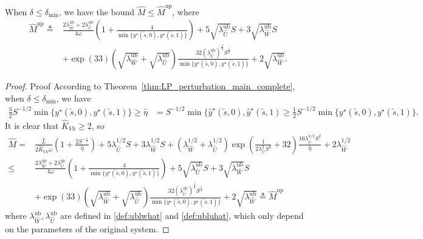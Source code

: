 \documentclass[mnsc,nonblindrev]{informs3}
\newcommand{\luhat}{\lambda_{\widehat{U}}}
\newcommand{\lwhhalf}{\lambda_{\widehat{W}}^{1/2}}
\newcommand{\luhhalf}{\lambda_{\widehat{U}}^{1/2}}
\newcommand{\ublwhat}{\lambda^{\mathrm{ub}}_{\widehat{W}}}
\newcommand{\ubluhat}{\lambda^{\mathrm{ub}}_{\widehat{U}}}
\newcommand{\ubmhat}{\widehat{M}^{\mathrm{up}}}
\newcommand{\yhat}{\widehat{y}}
\begin{document}
\begin{APPENDICES}
\begin{lemma}\label{lem:bound-of-Mhat}
    When $\delta\le\delta_{\min}$, we have the bound $\widehat{M}\le\ubmhat$, where
    \begin{equation}\label{def:ubmhat}
    \begin{aligned}
        \ubmhat\triangleq&\frac{2\ublwhat+2\ubluhat}{4\omega}\left(1+\frac{4}{\min\{y^\star(\tilde{s},0),y^\star(\tilde{s},1)\}}\right)+5\sqrt{\ubluhat}S+3\sqrt{\ublwhat}S\\
         & +\exp(33)\left(\sqrt{\ublwhat}+\sqrt{\ubluhat}\right)\frac{32(\ubluhat)^{\frac{3}{2}}S^{\frac{5}{2}}}{\min\{y^\star(\tilde{s},0),y^\star(\tilde{s},1)\}}+2\sqrt{\ublwhat}.
    \end{aligned}
    \end{equation}
\end{lemma}

\begin{proof}{Proof}
According to Theorem~\ref{thm:LP_perturbation_main_complete}, when $\delta\le\delta_{\min}$, we have
\begin{align*}
    \frac{3}{2}S^{-1/2}\min\{y^\star(\tilde{s},0),y^\star(\tilde{s},1)\}
    \ge\widehat \eta
    &=S^{-1/2}\min\{\yhat^\star(\tilde{s},0),\yhat^\star(\tilde{s},1) 
    \ge \frac{1}{2}S^{-1/2}\min\{y^\star(\tilde{s},0),y^\star(\tilde{s},1)\}.
    \end{align*}
It is clear that $\widehat K_{Vh}\ge 2$, so
    \begin{align*}
        \widehat M=&\frac{\widehat L}{2\widehat K_{Vh}\omega}\left(1
  + \frac{2S^{-\frac{1}{2}}}
         {\widehat \eta}\right)+5\luhhalf S+3\lwhhalf S 
          +(\lwhhalf+\luhhalf)\exp\left(\frac{1}{2\luhat^3S^3}+32\right)\frac{16\luhat^{3/2}S^{2}}{\widehat \eta} +2\lwhhalf \\
         \le &\frac{2\ublwhat+2\ubluhat}{4\omega}\left(1+\frac{4}{\min\{y^\star(\tilde{s},0),y^\star(\tilde{s},1)\}}\right)+5\sqrt{\ubluhat}S+3\sqrt{\ublwhat}S\\
         & +\exp(33)\left(\sqrt{\ublwhat}+\sqrt{\ubluhat}\right)\frac{32(\ubluhat)^{\frac{3}{2}}S^{\frac{5}{2}}}{\min\{y^\star(\tilde{s},0),y^\star(\tilde{s},1)\}}+2\sqrt{\ublwhat}\triangleq\ubmhat 
    \end{align*}
     where $\ublwhat,\ubluhat$ are defined in \eqref{def:ublwhat} and \eqref{def:ubluhat}, which only depend on the parameters of the original system.
\end{proof}


\end{APPENDICES}
\end{document}
